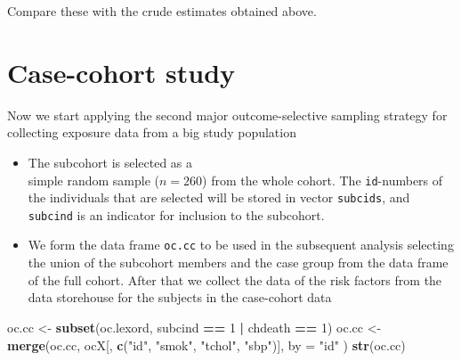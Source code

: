 \documentclass[
]{book}
\newenvironment{Shaded}{\begin{snugshade}}{\end{snugshade}}
\newcommand{\AttributeTok}[1]{\textcolor[rgb]{0.13,0.29,0.53}{#1}}
\newcommand{\DecValTok}[1]{\textcolor[rgb]{0.00,0.00,0.81}{#1}}
\newcommand{\FunctionTok}[1]{\textcolor[rgb]{0.13,0.29,0.53}{\textbf{#1}}}
\newcommand{\NormalTok}[1]{#1}
\newcommand{\OtherTok}[1]{\textcolor[rgb]{0.56,0.35,0.01}{#1}}
\newcommand{\SpecialCharTok}[1]{\textcolor[rgb]{0.81,0.36,0.00}{\textbf{#1}}}
\newcommand{\StringTok}[1]{\textcolor[rgb]{0.31,0.60,0.02}{#1}}
\providecommand{\tightlist}{%
  \setlength{\itemsep}{0pt}\setlength{\parskip}{0pt}}
\begin{document}
Compare these with the crude estimates obtained above.

\section{Case-cohort study}\label{case-cohort-study}

Now we start applying the second major outcome-selective
sampling strategy
for collecting exposure data from a big study population

\begin{itemize}
\tightlist
\item
  The subcohort is selected as a\\
  simple random sample (\(n=260\)) from the whole cohort.
  The \texttt{id}-numbers of the individuals that are
  selected will be stored in vector \texttt{subcids}, and
  \texttt{subcind} is an indicator for inclusion to the subcohort.
\end{itemize}

\begin{Shaded}
\end{Shaded}

\begin{itemize}
\tightlist
\item
  We form the data frame \texttt{oc.cc}
  to be used in the subsequent
  analysis selecting the union of the subcohort members
  and the case group from the data frame of the full cohort.
  After that we collect the data of the risk factors from the
  data storehouse for the subjects in the case-cohort data
\end{itemize}

\begin{Shaded}
\begin{Highlighting}[]
\NormalTok{oc.cc }\OtherTok{\textless{}{-}} \FunctionTok{subset}\NormalTok{(oc.lexord, subcind }\SpecialCharTok{==} \DecValTok{1} \SpecialCharTok{|}\NormalTok{ chdeath }\SpecialCharTok{==} \DecValTok{1}\NormalTok{)}
\NormalTok{oc.cc }\OtherTok{\textless{}{-}} \FunctionTok{merge}\NormalTok{(oc.cc, ocX[, }\FunctionTok{c}\NormalTok{(}\StringTok{"id"}\NormalTok{, }\StringTok{"smok"}\NormalTok{, }\StringTok{"tchol"}\NormalTok{, }\StringTok{"sbp"}\NormalTok{)],}
  \AttributeTok{by =} \StringTok{"id"}
\NormalTok{)}
\FunctionTok{str}\NormalTok{(oc.cc)}
\end{Highlighting}
\end{Shaded}
\end{document}
